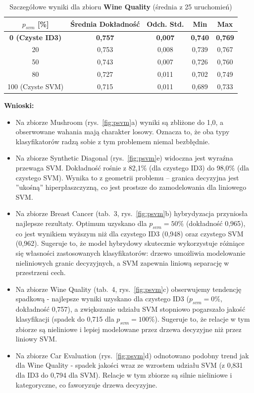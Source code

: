 \documentclass[a4paper,11pt]{article}
\begin{document}
\begin{table}[H]
    \centering
    \caption{Szczegółowe wyniki dla zbioru \textbf{Wine Quality} (średnia z 25 uruchomień)}
    \begin{tabular}{ccccc}
        \toprule
        \textbf{$p_{svm}$ [\%]} & \textbf{Średnia Dokładność} & \textbf{Odch. Std.} & \textbf{Min} & \textbf{Max} \\
        \midrule
        \textbf{0 (Czyste ID3)} & \textbf{0,757} & \textbf{0,007} & \textbf{0,740} & \textbf{0,769} \\
        20 & 0,753 & 0,008 & 0,739 & 0,767 \\
        50 & 0,743 & 0,007 & 0,726 & 0,760 \\
        80 & 0,727 & 0,011 & 0,702 & 0,749 \\
        100 (Czyste SVM) & 0,715 & 0,011 & 0,689 & 0,733 \\
        \bottomrule
    \end{tabular}
\end{table}

\textbf{Wnioski:}
\begin{itemize}
    \item Na zbiorze Mushroom (rys.~\ref{fig:psvm}a) wyniki są zbliżone do 1,0, a obserwowane wahania mają charakter losowy. Oznacza to, że oba typy klasyfikatorów radzą sobie z tym problemem niemal bezbłędnie.
    \item Na zbiorze Synthetic Diagonal (rys.~\ref{fig:psvm}e) widoczna jest wyraźna przewaga SVM. Dokładność rośnie z 82,1\% (dla czystego ID3) do 98,0\% (dla czystego SVM). Wynika to z geometrii problemu -- granica decyzyjna jest ''ukośną'' hiperpłaszczyzną, co jest prostsze do zamodelowania dla liniowego SVM.
    \item Na zbiorze Breast Cancer (tab.~3, rys.~\ref{fig:psvm}b) hybrydyzacja przyniosła najlepsze rezultaty. Optimum uzyskano dla $p_{svm}=50\%$ (dokładność 0,965), co jest wynikiem wyższym niż dla czystego ID3 (0,948) oraz czystego SVM (0,962). Sugeruje to, że model hybrydowy skutecznie wykorzystuje różniące się własności zastosowanych klasyfikatorów: drzewo umożliwia modelowanie nieliniowych granic decyzyjnych, a SVM zapewnia liniową separację w przestrzeni cech.
    \item Na zbiorze Wine Quality (tab.~4, rys.~\ref{fig:psvm}c) obserwujemy tendencję spadkową - najlepsze wyniki uzyskano dla czystego ID3 ($p_{svm}=0\%$, dokładność 0,757), a zwiększanie udziału SVM stopniowo pogarszało jakość klasyfikacji (spadek do 0,715 dla $p_{svm}=100\%$). Sugeruje to, że relacje w tym zbiorze są nieliniowe i lepiej modelowane przez drzewa decyzyjne niż przez liniowy SVM.
    \item Na zbiorze Car Evaluation (rys.~\ref{fig:psvm}d) odnotowano podobny trend jak dla Wine Quality - spadek jakości wraz ze wzrostem udziału SVM (z 0,831 dla ID3 do 0,794 dla SVM). Relacje w tym zbiorze są silnie nieliniowe i kategoryczne, co faworyzuje drzewa decyzyjne.
\end{itemize}
\end{document}
